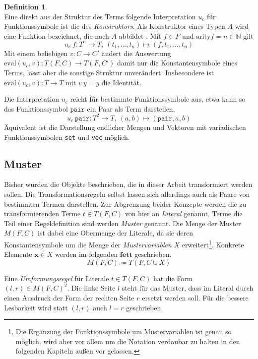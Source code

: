 \documentclass{scrartcl}
\numberwithin{figure}{section} %
\theoremstyle{definition} %
\newcommand{\elems}[3]{{#1}_{#2}, \dots, {#1}_{#3}}
\newcommand{\tOneN}{\elems t 1 n}
\begin{document}
\newtheorem{defKonstruktor}[bsp]{Definition}
\begin{defKonstruktor}~\\
Eine direkt aus der Struktur des Terms folgende Interpretation $u_c$ für Funktionssymbole ist die des \emph{Konstruktors}. Als Konstruktor eines Typen $A$ wird eine Funktion bezeichnet, die nach $A$ abbildet \cite{haskellConstructor}. Mit $f \in F$ und $\mathrm{arity} f = n \in \mathbb N$ 
gilt $$u_c~f \colon T^n \rightarrow T, ~(\tOneN) \mapsto (f, \tOneN)$$
Mit einem beliebigen $v \colon C \rightarrow C'$ ändert die Auswertung $\mathrm{eval}(u_c, v) \colon T(F, C) \rightarrow T(F, C')$ damit nur die Konstantensymbole eines Terms, lässt aber die sonstige Struktur unverändert. Insbesondere ist $\mathrm{eval}(u_c, v) \colon T \rightarrow T$ mit $v~y = y$ die Identität.

Die Interpretation $u_c$ reicht für bestimmte Funktionssymbole aus, etwa kann so das Funktionssymbol $\texttt{pair}$ ein Paar als Term darstellen.
$$u_c~\texttt{pair} \colon T^2 \rightarrow T, ~(a, b) \mapsto (\texttt{pair}, a, b)$$
Äquivalent ist die Darstellung endlicher Mengen und Vektoren mit variadischen Funktionssymbolen \texttt{set} und \texttt{vec} möglich.
\end{defKonstruktor}


\subsection{Muster} \label{subsecMuster}

Bisher wurden die Objekte beschrieben, die in dieser Arbeit transformiert werden sollen. Die Transformationsregeln selbst lassen sich allerdings auch als Paare von bestimmten Termen darstellen. Zur Abgrenzung beider Konzepte werden die zu transformierenden Terme $t\in T(F, C)$ von hier an \emph{Literal} genannt, Terme die  Teil einer Regeldefinition sind werden \emph{Muster} genannt. Die Menge der Muster $M(F, C)$ ist dabei eine Obermenge der Literale, da sie deren Konstantensymbole um die Menge der \emph{Mustervariablen} $X$ erweitert\footnote{Die Ergänzung der Funktionssymbole um Mustervariablen ist genau so möglich, wird aber vor allem um die Notation verdaubar zu halten in den folgenden Kapiteln außen vor gelassen.}. Konkrete Elemente $\mathbf x \in X$ werden im folgenden $\mathbf{fett}$ geschrieben.
$$M(F, C) \coloneqq T(F, C \cup X)$$

Eine \emph{Umformungsregel} für Literale $t \in T(F, C)$ hat die Form $(l, r) \in M(F, C)^2$. Die linke Seite $l$ steht für das Muster, dass im Literal durch einen Ausdruck der Form der rechten Seite $r$ ersetzt werden soll. Für die bessere Lesbarkeit wird statt $(l, r)$ auch $l = r$ geschrieben.
\end{document}
